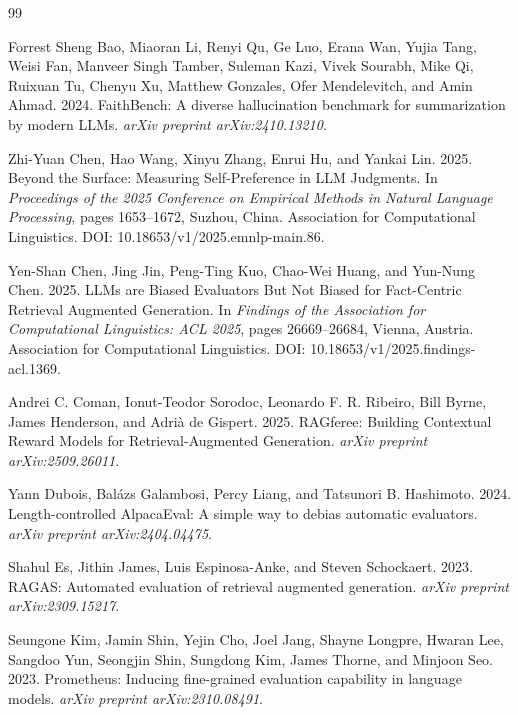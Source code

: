 \begin{thebibliography}{99}

Forrest Sheng Bao, Miaoran Li, Renyi Qu, Ge Luo, Erana Wan, Yujia Tang, Weisi Fan, Manveer Singh Tamber, Suleman Kazi, Vivek Sourabh, Mike Qi, Ruixuan Tu, Chenyu Xu, Matthew Gonzales, Ofer Mendelevitch, and Amin Ahmad. 2024.
\newblock FaithBench: A diverse hallucination benchmark for summarization by modern LLMs.
\newblock \emph{arXiv preprint arXiv:2410.13210}.

Zhi-Yuan Chen, Hao Wang, Xinyu Zhang, Enrui Hu, and Yankai Lin. 2025.
\newblock Beyond the Surface: Measuring Self-Preference in LLM Judgments.
\newblock In \emph{Proceedings of the 2025 Conference on Empirical Methods in Natural Language Processing}, pages 1653--1672, Suzhou, China. Association for Computational Linguistics. DOI: 10.18653/v1/2025.emnlp-main.86.

Yen-Shan Chen, Jing Jin, Peng-Ting Kuo, Chao-Wei Huang, and Yun-Nung Chen. 2025.
\newblock LLMs are Biased Evaluators But Not Biased for Fact-Centric Retrieval Augmented Generation.
\newblock In \emph{Findings of the Association for Computational Linguistics: ACL 2025}, pages 26669--26684, Vienna, Austria. Association for Computational Linguistics. DOI: 10.18653/v1/2025.findings-acl.1369.

Andrei C. Coman, Ionut-Teodor Sorodoc, Leonardo F. R. Ribeiro, Bill Byrne, James Henderson, and Adri{\`a} de Gispert. 2025.
\newblock RAGferee: Building Contextual Reward Models for Retrieval-Augmented Generation.
\newblock \emph{arXiv preprint arXiv:2509.26011}.

Yann Dubois, Bal{\'a}zs Galambosi, Percy Liang, and Tatsunori B. Hashimoto. 2024.
\newblock Length-controlled AlpacaEval: A simple way to debias automatic evaluators.
\newblock \emph{arXiv preprint arXiv:2404.04475}.

Shahul Es, Jithin James, Luis Espinosa-Anke, and Steven Schockaert. 2023.
\newblock RAGAS: Automated evaluation of retrieval augmented generation.
\newblock \emph{arXiv preprint arXiv:2309.15217}.

Seungone Kim, Jamin Shin, Yejin Cho, Joel Jang, Shayne Longpre, Hwaran Lee, Sangdoo Yun, Seongjin Shin, Sungdong Kim, James Thorne, and Minjoon Seo. 2023.
\newblock Prometheus: Inducing fine-grained evaluation capability in language models.
\newblock \emph{arXiv preprint arXiv:2310.08491}.


\end{thebibliography}
